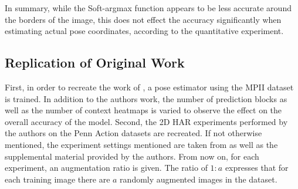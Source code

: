\begin{table}[]
    \centering
    \caption{Mean average accuracy (in percent) of Soft-argmax when detecting ground truth coordinates from synthetic joint heatmaps. Threshold referrs to the amound of pixels the estimate is allowed to deviate from the ground truth annotation. $c$ referres to the covariance used for creating the synthetic heatmaps. The large discrepancy between a threshold of $1$ and a threshold of $2$ is most likely due to rounding errors.}
    \label{tab:softargmax_numeric_eval}
\end{table}

In summary, while the Soft-argmax function appears to be less accurate around the borders of the image, this does not effect the accuracy significantly when estimating actual pose coordinates, according to the quantitative experiment.

\subsection{Replication of Original Work}
\label{sec:exp-replication}

First, in order to recreate the work of \cite{luvizon_2d/3d_2018}, a pose estimator using the MPII dataset is trained.
In addition to the authors work, the number of prediction blocks as well as the number of context heatmaps is varied to observe the effect on the overall accuracy of the model.
Second, the 2D HAR experiments performed by the authors on the Penn Action datasets are recreated.
If not otherwise mentioned, the experiment settings mentioned are taken from \cite{luvizon_2d/3d_2018} as well as the supplemental material provided by the authors.
From now on, for each experiment, an augmentation ratio is given.
The ratio of $1:a$ expresses that for each training image there are $a$ randomly augmented images in the dataset.


